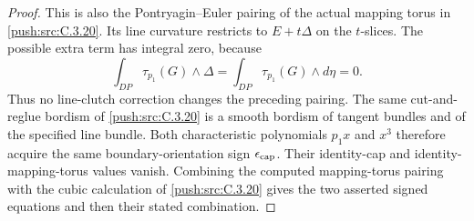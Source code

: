 \begin{proof}
This is also the Pontryagin--Euler pairing of the actual
mapping torus in \ref{push:src:C.3.20}. Its line curvature restricts to
$E+t\Delta$ on the $t$-slices. The possible extra term
has integral zero, because
\[
 \int_{DP}\tau_{p_1}(G)\wedge\Delta
 =\int_{DP}\tau_{p_1}(G)\wedge d\eta=0.
\]
Thus no line-clutch correction changes the preceding
pairing. The same cut-and-reglue bordism of \ref{push:src:C.3.20} is a
smooth bordism of tangent bundles and of the specified
line bundle. Both characteristic polynomials $p_1x$
and $x^3$ therefore acquire the same boundary-orientation
sign $\epsilon_{\rm cap}$. Their identity-cap and
identity-mapping-torus values vanish. Combining the
computed mapping-torus pairing with the cubic calculation
of \ref{push:src:C.3.20} gives the two asserted signed equations and
then their stated combination.
\end{proof}

